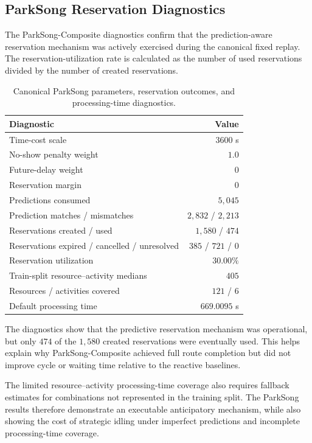 \subsection{ParkSong Reservation Diagnostics}
\label{app:joao-parksong-diagnostics}

The ParkSong-Composite diagnostics confirm that the prediction-aware
reservation mechanism was actively exercised during the canonical fixed replay.
The reservation-utilization rate is calculated as the number of used
reservations divided by the number of created reservations.

\begin{table}[H]
    \caption{Canonical ParkSong parameters, reservation outcomes, and
    processing-time diagnostics.}
    \label{tab:joao_parksong_diagnostics}
    \centering
    \renewcommand{\arraystretch}{1.1}
    \small
    \begin{tabular}{lr}
        \toprule
        \textbf{Diagnostic} & \textbf{Value} \\
        \midrule
        Time-cost scale
        & $3600$ s \\
        No-show penalty weight
        & $1.0$ \\
        Future-delay weight
        & $0$ \\
        Reservation margin
        & $0$ \\
        Predictions consumed
        & $5{,}045$ \\
        Prediction matches / mismatches
        & $2{,}832$ / $2{,}213$ \\
        Reservations created / used
        & $1{,}580$ / $474$ \\
        Reservations expired / cancelled / unresolved
        & $385$ / $721$ / $0$ \\
        Reservation utilization
        & $30.00\%$ \\
        Train-split resource--activity medians
        & $405$ \\
        Resources / activities covered
        & $121$ / $6$ \\
        Default processing time
        & $669.0095$ s \\
        \bottomrule
    \end{tabular}
\end{table}

The diagnostics show that the predictive reservation mechanism was operational,
but only $474$ of the $1{,}580$ created reservations were eventually used.
This helps explain why ParkSong-Composite achieved full route completion but
did not improve cycle or waiting time relative to the reactive baselines.

The limited resource--activity processing-time coverage also requires fallback
estimates for combinations not represented in the training split. The ParkSong
results therefore demonstrate an executable anticipatory mechanism, while also
showing the cost of strategic idling under imperfect predictions and incomplete
processing-time coverage.